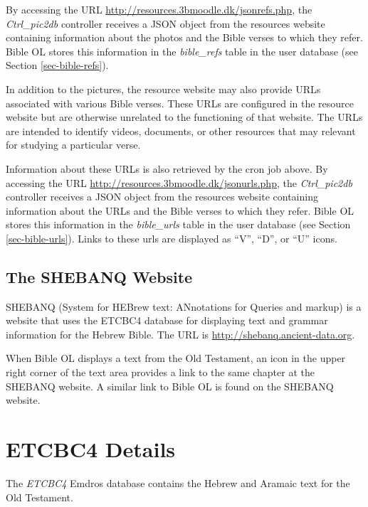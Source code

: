 \documentclass[11pt,oneside,a4paper]{memoir}
\begin{document}
By accessing the URL \url{http://resources.3bmoodle.dk/jsonrefs.php}, the \emph{Ctrl\_pic2db}
controller receives a JSON object from the resources website containing information about the photos
and the Bible verses to which they refer. Bible OL stores this information in the \emph{bible\_refs}
table in the user database (see Section \ref{sec-bible-refs}).

In addition to the pictures, the resource website may also provide URLs associated with various
Bible verses. These URLs are configured in the resource website but are otherwise unrelated to the
functioning of that website. The URLs are intended to identify videos, documents, or other resources
that may relevant for studying a particular verse.

Information about these URLs is also retrieved by the cron job above. By accessing the URL
\url{http://resources.3bmoodle.dk/jsonurls.php}, the \emph{Ctrl\_pic2db} controller receives a JSON
object from the resources website containing information about the URLs and the Bible verses to
which they refer. Bible OL stores this information in the \emph{bible\_urls} table in the user
database (see Section \ref{sec-bible-urls}). Links to these urls are displayed as ``V'', ``D'', or
``U'' icons.

\section{The SHEBANQ Website}

SHEBANQ (System for HEBrew text: ANnotations for Queries and markup) is a website that uses the
ETCBC4 database for displaying text and grammar information for the Hebrew Bible. The URL is
\url{http://shebanq.ancient-data.org}.

 When Bible OL
displays a text from the Old Testament, an icon in the upper right corner of the text area provides
a link to the same chapter at the SHEBANQ website. A similar link to Bible OL is found on the
SHEBANQ website.


\appendix
\chapter{ETCBC4 Details}\label{etcbc-app}

The \emph{ETCBC4} Emdros database contains the Hebrew and Aramaic text for the Old Testament.
\end{document}
